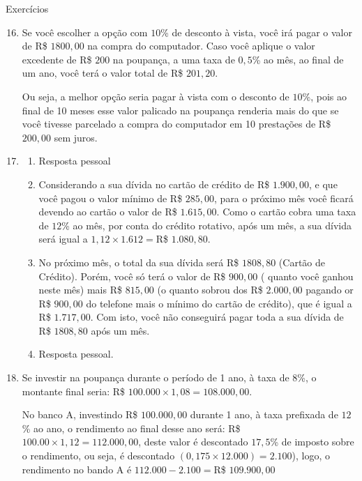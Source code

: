 \begin{answer}{Exercícios}
{\exerciselist

  \begin{enumerate}\setcounter{enumi}{15}
    \item Se você escolher a opção com $10$\% de desconto à vista, você irá pagar o valor de R\$ $1800{,}00$ na compra do computador. Caso você aplique o valor excedente de R\$ $200$ na poupança, a uma taxa de $0{,}5$\% ao mês, ao final de um ano, você terá o valor total de R\$ $201{,}20$.

    Ou seja, a melhor opção seria pagar à vista com o desconto de $10$\%, pois ao final de 10 meses esse valor palicado na poupança renderia mais do que se você tivesse parcelado a compra do computador em 10 prestações de R\$ $200{,}00$ sem juros.

    \item
    \begin{enumerate}
      \item Resposta pessoal
      \item Considerando a sua dívida no cartão de crédito de R\$ $1.900{,}00$, e que você pagou o valor mínimo de R\$ $285{,}00$, para o próximo mês você ficará devendo ao cartão o valor de R\$ $1.615{,}00$. Como o cartão cobra uma taxa de $12$\% ao mês, por conta do crédito rotativo, após um mês, a sua dívida será igual a $1{,}12\times1.612=$R\$ $1.080{,}80$.
      \item No próximo mês, o total da sua dívida será R\$ $1808{,}80$ (Cartão de Crédito). Porém, você só terá o valor de R\$ $900{,}00$ ( quanto você ganhou neste mês) mais R\$ $815{,}00$ (o quanto sobrou dos R\$ $2.000{,}00$ pagando or R\$ $900{,}00$ do telefone mais o mínimo do cartão de crédito), que é igual a R\$ $1.717{,}00$. Com isto, você não conseguirá pagar toda a sua dívida de R\$ $1808{,}80$ após um mês.
      \item Resposta pessoal.
    \end{enumerate}
    \item Se investir na poupança durante o período de 1 ano, à taxa de $8$\%, o montante final seria: R\$ $100.000\times1{,}08=108.000{,}00$.

    No banco A, investindo R\$ $100.000{,}00$ durante 1 ano, à taxa prefixada de $12$\% ao ano, o rendimento ao final desse ano será: R\$ $100.00\times1{,}12=112.000{,}00$, deste valor é descontado $17{,}5$\% de imposto sobre o rendimento, ou seja, é descontado $(0{,}175\times12.000)=2.100$), logo, o rendimento no bando A é $112.000-2.100=$R\$ $109.900{,}00$


\end{enumerate}}
\end{answer}
